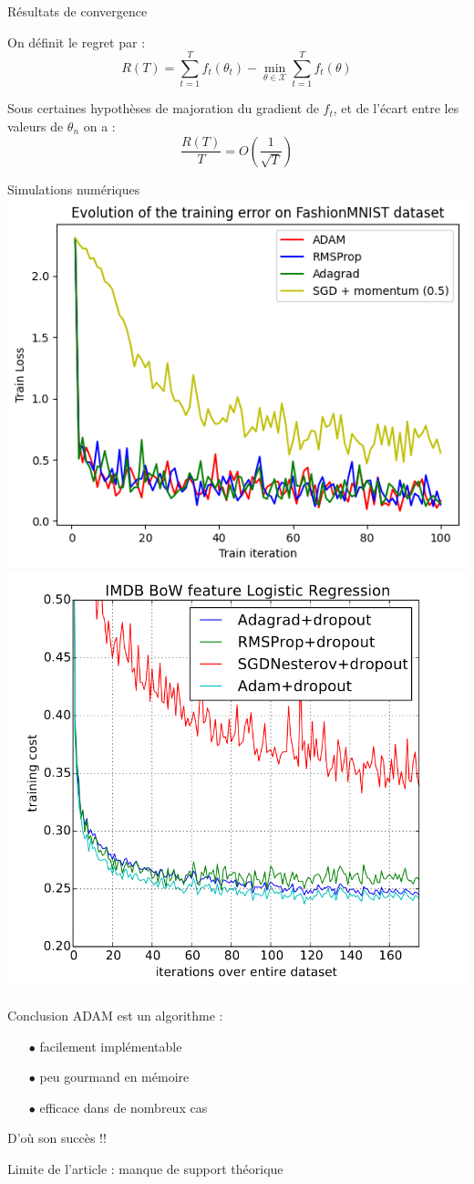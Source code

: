 \documentclass[11pt,aspectratio=169,xcolor=dvipsnames, french]{beamer}
\begin{document}
\begin{frame}{Résultats de convergence}

On définit le regret par : $$R(T)=\sum_{t=1}^{T}f_t(\theta_t)-\min_{\theta\in\mathcal{X}}\sum_{t=1}^{T}f_t(\theta)$$

\begin{theorem}
  Sous certaines hypothèses de majoration du gradient de $f_t$, et de l'écart entre les valeurs de $\theta_n$ on a : 
    $$\frac{R(T)}{T}=O\left(\frac{1}{\sqrt{T}}\right)$$  
\end{theorem}

\end{frame}



\begin{frame}{Simulations numériques}
  \includegraphics[width=0.45\linewidth]{../Images/FashionMNIST.png} \hfill \includegraphics[width=0.45\linewidth]{../Images/IMDB_article.png}
\end{frame}

\begin{frame}{Conclusion}
ADAM est un algorithme :  

\begin{itemize}
\item[$\bullet$] facilement implémentable 
\item[$\bullet$] peu gourmand en mémoire
\item[$\bullet$] efficace dans de nombreux cas
\end{itemize}

D'où son succès !! 

Limite de l'article : manque de support théorique

\end{frame}
\end{document}
